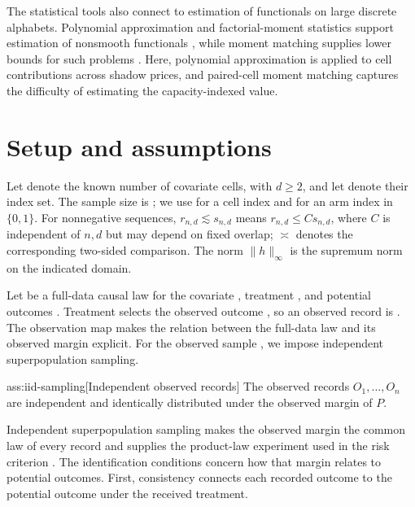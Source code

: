 \documentclass[11pt]{article}
\begin{document}
The statistical tools also connect to estimation of functionals on large discrete alphabets. Polynomial approximation and factorial-moment statistics support estimation of nonsmooth functionals \citep{JiaoVenkatHanWeissman2015}, while moment matching supplies lower bounds for such problems \citep{CaiLow2011,JiaoHanWeissman2018}. Here, polynomial approximation is applied to cell contributions across shadow prices, and paired-cell moment matching captures the difficulty of estimating the capacity-indexed value.


\section{Setup and assumptions}

Let  denote the known number of covariate cells, with \(d\ge2\), and let  denote their index set. The sample size is ; we use  for a cell index and  for an arm index in \(\{0,1\}\). For nonnegative sequences, \(r_{n,d}\lesssim s_{n,d}\) means \(r_{n,d}\le C s_{n,d}\), where \(C\) is independent of \(n,d\) but may depend on fixed overlap; \(\asymp\) denotes the corresponding two-sided comparison. The norm \(\|h\|_\infty\) is the supremum norm on the indicated domain.

Let  be a full-data causal law for the covariate , treatment , and potential outcomes . Treatment selects the observed outcome , so an observed record is . The observation map makes the relation between the full-data law and its observed margin explicit. For the observed sample , we impose independent superpopulation sampling.

\begin{assumptionv}{ass:iid-sampling}[Independent observed records]
The observed records \(O_1,\ldots,O_n\) are independent and identically distributed under the observed margin of \(P\).
\end{assumptionv}

Independent superpopulation sampling makes the observed margin the common law of every record and supplies the product-law experiment used in the risk criterion \citep{vanDerVaart1998}. The identification conditions concern how that margin relates to potential outcomes. First, consistency connects each recorded outcome to the potential outcome under the received treatment.
\end{document}
